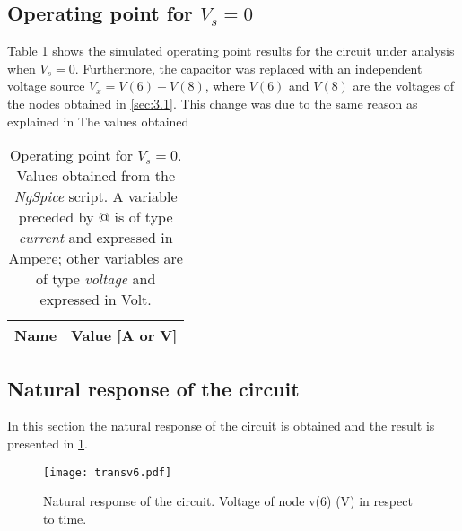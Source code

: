 \subsection{Operating point for $V_s=0$}
\label{sec:3.2}

Table \ref{op:tab_5} shows the simulated operating point results for the circuit under analysis when $V_s=0$. Furthermore, the capacitor was replaced with an independent voltage source $V_x=V(6)-V(8)$, where $V(6)$ and $V(8)$ are the voltages of the nodes obtained in \ref{sec:3.1}. This change was due to the same reason as explained in %
The values obtained 

\begin{table}[h]
  \centering
  \def\arraystretch{1.2}
 
\begin{tabular}{c|c}
    \hline    
    \textbf{Name} & \textbf{Value [A or V]} \\ \hline
    
    \hline
  \end{tabular}
  \captionsetup{justification=centering, margin=2cm}
  \caption{Operating point for $V_s=0$. Values obtained from the \emph{NgSpice} script. A variable preceded by @ is of type {\em current} and expressed in Ampere; other variables are of type {\it voltage} and expressed in Volt.}
  \label{op:tab_5}
\end{table}
\FloatBarrier

\subsection{Natural response of the circuit}
\label{sec:3.3}

In this section the natural response of the circuit is obtained and the result is presented in \ref{transv6}. 

\begin{figure}[!htp] \centering
\texttt{[image: transv6.pdf]}
\captionsetup{justification=centering, margin=2cm}
\caption{Natural response of the circuit. Voltage of node v(6) (V) in respect to time.}
\label{transv6}
\end{figure}
\FloatBarrier


